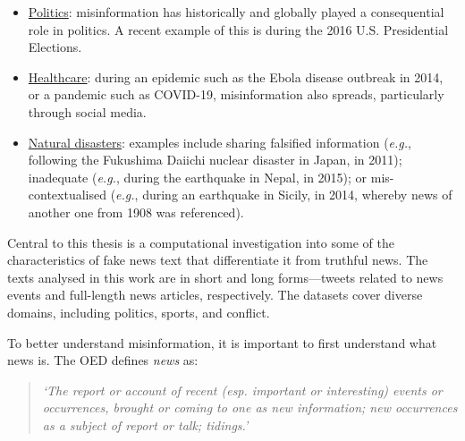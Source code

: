 \begin{itemize}
    \item \underline{Politics}: misinformation has historically and globally played a consequential role in politics. A recent example of this is during the 2016 U.S. Presidential Elections.
    \item \underline{Healthcare}: during an epidemic such as the Ebola disease outbreak in 2014, or a pandemic such as COVID-19, misinformation also spreads, particularly through social media.
    \item \underline{Natural disasters}: examples include sharing falsified information (\emph{e.g.}, following the Fukushima Daiichi nuclear disaster in Japan, in 2011); inadequate (\emph{e.g.}, during the earthquake in Nepal, in 2015); or mis-contextualised (\emph{e.g.}, during an earthquake in Sicily, in 2014, whereby news of another one from 1908 was referenced).
\end{itemize}

Central to this thesis is a computational investigation into some of the characteristics of fake news text that differentiate it from truthful news. The texts analysed in this work are in short and long forms—tweets related to news events and full-length news articles, respectively. The datasets cover diverse domains, including politics, sports, and conflict.

To better understand misinformation, it is important to first understand what news is. The \acf{OED}  defines \emph{news} as:

\begin{quote}
  \begin{Center}
  \emph{`The report or account of recent (esp. important or interesting) events or occurrences, brought or coming to one as new information; new occurrences as a subject of report or talk; tidings.'}
  \end{Center}
\end{quote}

